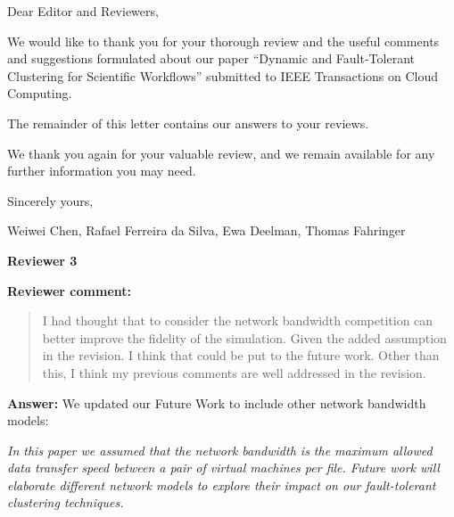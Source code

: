 \documentclass{letter}
\date{Mar 17, 2015}
\newenvironment{review}%
{\textbf{Reviewer comment:}\begin{quote}}%
{\end{quote}}%
\newcommand{\answer}[1]{%
      \textbf{Answer:} #1}
\newcommand{\revised}[1]{\emph{#1}\color{black}}
\begin{document}
\begin{letter}{}

\opening{Dear Editor and Reviewers,}

We would like to thank you for your thorough review and the useful
comments and suggestions formulated about our paper ``Dynamic and Fault-Tolerant Clustering for Scientific Workflows'' submitted to
IEEE Transactions on Cloud Computing.

The remainder of this letter contains our answers to your reviews. 

We thank you again for your valuable review, and we remain available for any further information you may need.

\vspace{0.5cm}

Sincerely yours,

\vspace{1cm}

Weiwei Chen, Rafael Ferreira da Silva, Ewa Deelman, Thomas Fahringer

\newpage

%
%
\textbf{Reviewer 3}

\begin{review}
I had thought that to consider the network bandwidth competition can better improve the fidelity of the simulation. Given the added assumption in the revision. I think that could be put to the future work. Other than this, I think my previous comments are well addressed in the revision.
\end{review}

\answer{We updated our Future Work to include other network bandwidth models:}

\revised{In this paper we assumed that the network 
bandwidth is the maximum allowed data transfer speed between a pair of virtual machines per file. 
Future work will elaborate different network models to explore their impact on our fault-tolerant 
clustering techniques.}


\end{letter}
\end{document}
